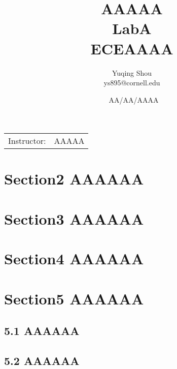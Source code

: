 \documentclass{article}
\title{AAAAA \\ LabA \\ ECEAAAA} %
\author{Yuqing Shou \\ ys895@cornell.edu} %
\date{\ AA/AA/AAAA} %
\begin{document}
\maketitle %
\begin{center}
\begin{tabular}{l r}
Instructor: & AAAAA %
\end{tabular}
\end{center}


\newpage
\section*{Section2 AAAAAA}


\newpage
\section*{Section3 AAAAAA}


\newpage
\section*{Section4 AAAAAA}


\newpage
\section*{Section5 AAAAAA}
\subsection*{5.1 AAAAAA}

\newpage
\subsection*{5.2 AAAAAA}







\begin{comment}
\end{comment}
\end{document}
